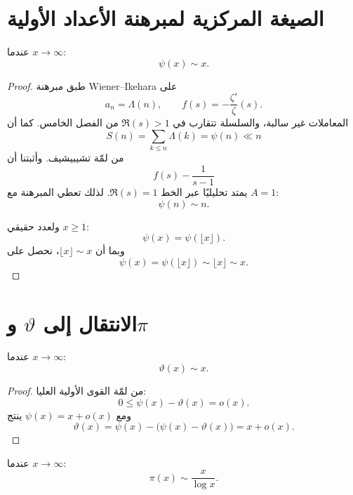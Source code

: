 \section{الصيغة المركزية لمبرهنة الأعداد الأولية}

\begin{theorem}
\label{thm:prime-number-theorem-psi}
\provedhere
عندما \(x\to\infty\):
\[
\psi(x)\sim x.
\]
\end{theorem}

\begin{proof}
طبق مبرهنة Wiener--Ikehara على
\[
a_n=\Lambda(n),
\qquad
f(s)=-\frac{\zeta'}{\zeta}(s).
\]
المعاملات غير سالبة، والسلسلة تتقارب في \(\Re(s)>1\) من الفصل الخامس.
كما أن
\[
S(n)=\sum_{k\le n}\Lambda(k)=\psi(n)\ll n
\]
من لمّة تشيبيشيف. وأثبتنا أن
\[
f(s)-\frac1{s-1}
\]
يمتد تحليليًا عبر الخط \(\Re(s)=1\). لذلك تعطي المبرهنة مع \(A=1\):
\[
\psi(n)\sim n.
\]

ولعدد حقيقي \(x\ge1\):
\[
\psi(x)=\psi(\lfloor x\rfloor).
\]
وبما أن \(\lfloor x\rfloor\sim x\)، نحصل على
\[
\psi(x)
=
\psi(\lfloor x\rfloor)
\sim
\lfloor x\rfloor
\sim x.
\]
\end{proof}

\section{الانتقال إلى \(\vartheta\) و\(\pi\)}

\begin{corollary}
\label{cor:prime-number-theorem-theta}
\provedhere
عندما \(x\to\infty\):
\[
\vartheta(x)\sim x.
\]
\end{corollary}

\begin{proof}
من لمّة القوى الأولية العليا:
\[
0\le\psi(x)-\vartheta(x)=o(x).
\]
ومع \(\psi(x)=x+o(x)\) ينتج
\[
\vartheta(x)
=
\psi(x)-\bigl(\psi(x)-\vartheta(x)\bigr)
=x+o(x).
\]
\end{proof}

\begin{corollary}
\label{cor:prime-number-theorem-pi}
\provedhere
عندما \(x\to\infty\):
\[
\pi(x)\sim\frac{x}{\log x}.
\]
\end{corollary}

